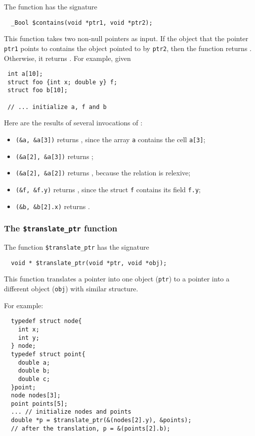 The function \ccontains{} has the signature
\begin{verbatim}
  _Bool $contains(void *ptr1, void *ptr2);
\end{verbatim}

This function takes two non-null pointers as input. If  the object that the pointer \texttt{ptr1} points to contains the object pointed to by \texttt{ptr2},  then the
function returns \ctrue. Otherwise, it returns \cfalse. For example, given 
\begin{verbatim}
 int a[10];
 struct foo {int x; double y} f;
 struct foo b[10];

 // ... initialize a, f and b
\end{verbatim}

Here are the results of several invocations of  \ccontains:

\begin{itemize}
\item \texttt{\ccontains(\&a, \&a[3])} returns  \ctrue, since  the array \texttt{a} contains the cell \texttt{a[3]};
\item \texttt{\ccontains(\&a[2], \&a[3])} returns \cfalse;
\item \texttt{\ccontains(\&a[2], \&a[2])} returns \ctrue, because the relation is relexive;
\item  \texttt{\ccontains(\&f, \&f.y)} returns \ctrue, since the struct \texttt{f} contains its field \texttt{f.y};
\item \texttt{\ccontains(\&b, \&b[2].x)} returns \ctrue.
\end{itemize}

\subsubsection{The \texttt{\$translate\_ptr} function}
The function \texttt{\$translate\_ptr} has the signature
\begin{verbatim}
  void * $translate_ptr(void *ptr, void *obj);
\end{verbatim}

This function translates a pointer into one object (\texttt{ptr}) to a pointer into a different object (\texttt{obj}) with similar structure. 

For example:
\begin{verbatim}
  typedef struct node{
    int x;
    int y;
  } node;
  typedef struct point{
    double a;
    double b;
    double c;
  }point;
  node nodes[3];
  point points[5];
  ... // initialize nodes and points
  double *p = $translate_ptr(&(nodes[2].y), &points);
  // after the translation, p = &(points[2].b);
\end{verbatim}

